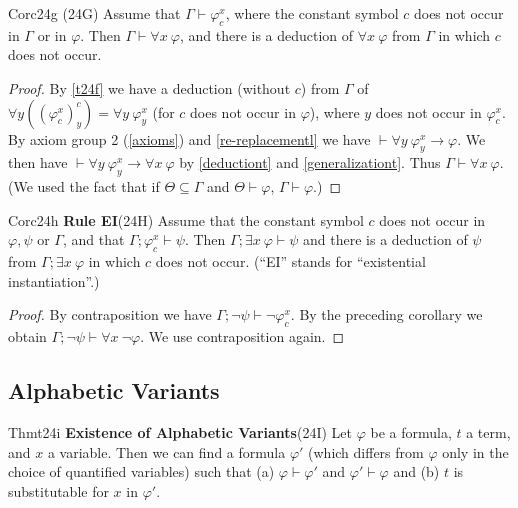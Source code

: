 \begin{reference}{Cor}{c24g}
  (24G) Assume that $\Gamma\vdash \varphi_c^x$, where the constant symbol $c$ does not occur in $\Gamma$ or in $\varphi$. Then $\Gamma\vdash\forall x\ \varphi$, and there is a deduction of $\forall x\ \varphi$ from $\Gamma$ in which $c$ does not occur.
\end{reference}

\begin{proof}
  By \ref{t24f} we have a deduction (without $c$) from $\Gamma$ of $\forall y((\varphi_c^x)_y^c)=\forall y\ \varphi_y^x$ (for $c$ does not occur in $\varphi$), where $y$ does not occur in $\varphi_c^x$. By axiom group 2 (\ref{axioms}) and \ref{re-replacementl} we have $\vdash\forall y\ \varphi_y^x\rightarrow \varphi$. We then have $\vdash\forall y\ \varphi_y^x\rightarrow\forall x\ \varphi$ by \ref{deductiont} and \ref{generalizationt}. Thus $\Gamma\vdash\forall x\ \varphi$. (We used the fact that if $\Theta\subseteq \Gamma$ and $\Theta\vdash \varphi$, $\Gamma\vdash \varphi$.)
\end{proof}

\begin{reference}{Cor}{c24h}
  \textbf{Rule EI}\quad (24H) Assume that the constant symbol $c$ does not occur in $\varphi,\psi$ or $\Gamma$, and that $\Gamma;\varphi_c^x\vdash \psi$. Then $\Gamma;\exists x\ \varphi\vdash \psi$ and there is a deduction of $\psi$ from $\Gamma;\exists x\ \varphi$ in which $c$ does not occur. (``EI'' stands for ``existential instantiation''.)
\end{reference}

\begin{proof}
  By contraposition we have $\Gamma;\neg \psi\vdash\neg \varphi_c^x$. By the preceding corollary we obtain $\Gamma;\neg \psi\vdash\forall x\ \neg \varphi$. We use contraposition again.
\end{proof}

\subsection*{Alphabetic Variants}

\begin{reference}{Thm}{t24i}
  \textbf{Existence of Alphabetic Variants}\quad (24I) Let $\varphi$ be a formula, $t$ a term, and $x$ a variable. Then we can find a formula $\varphi'$ (which differs from $\varphi$ only in the choice of quantified variables) such that (a) $\varphi\vdash \varphi'$ and $\varphi'\vdash \varphi$ and (b) $t$ is substitutable for $x$ in $\varphi'$.
\end{reference}

